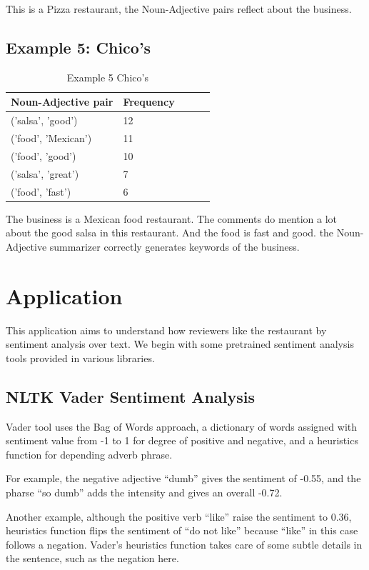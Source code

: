 \documentclass[sigconf]{acmart}
\begin{document}
This is a Pizza restaurant, the Noun-Adjective pairs reflect about the business.

\subsection{Example 5: Chico's}
\begin{table}
  \caption{Example 5 Chico's}
  \label{tab:n_adj_5}
  \begin{tabular}{lllll}
    \toprule
    Noun-Adjective pair & Frequency \\
    \midrule
    ('salsa', 'good') & 12\\
    ('food', 'Mexican') & 11\\
    ('food', 'good') & 10\\
    ('salsa', 'great') & 7\\
    ('food', 'fast') & 6\\
\end{tabular}
\end{table}
The business is a Mexican food restaurant. The comments do mention a lot about the good salsa in this restaurant. And the food is fast and good. the Noun-Adjective summarizer correctly generates keywords of the business.

\section{Application}
This application aims to understand how reviewers like the restaurant by sentiment analysis over text. We begin with some pretrained sentiment analysis tools provided in various libraries.  

\subsection{NLTK Vader Sentiment Analysis}

Vader tool\cite{Vader} uses the Bag of Words approach, a dictionary of words assigned with sentiment value from -1 to 1 for degree of positive and negative, and a heuristics function for depending adverb phrase. 

For example, the negative adjective “dumb” gives the sentiment of -0.55, and the pharse “so dumb” adds the intensity and gives an overall -0.72. 

Another example, although the positive verb “like” raise the sentiment to 0.36, heuristics function flips the sentiment of “do not like” because “like” in this case follows a negation. Vader’s heuristics function takes care of some subtle details in the sentence, such as the negation here.
\end{document}
